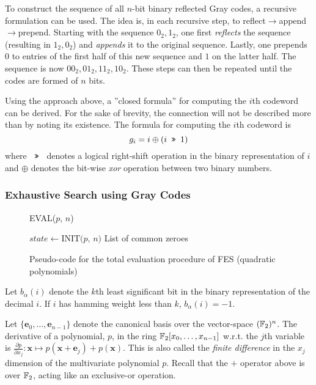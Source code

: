 To construct the sequence of all $n$-bit binary reflected Gray codes, a recursive formulation can be used. The idea is, in each recursive step, to reflect$\rightarrow$append$\rightarrow$prepend. Starting with the sequence $0_2, 1_2$, one first \textit{reflects} the sequence (resulting in $1_2, 0_2$) and \textit{appends} it to the original sequence. Lastly, one prepends $0$ to entries of the first half of this new sequence and $1$ on the latter half. The sequence is now $00_2, 01_2, 11_2, 10_2$. These steps can then be repeated until the codes are formed of $n$ bits.

Using the approach above, a ''closed formula'' for computing the $i$th codeword can be derived. For the sake of brevity, the connection will not be described more than by noting its existence. The formula for computing the $i$th codeword is
$$
    g_i = i \oplus (i \texttt{ >> } 1)
$$
where $\texttt{ >> }$ denotes a logical right-shift operation in the binary representation of $i$ and $\oplus$ denotes the bit-wise \textit{xor} operation between two binary numbers.

\subsubsection{Exhaustive Search using Gray Codes} \label{sec:prereq:fes:exh_g_code}
\begin{figure}[t]
    \begin{alg}
        \caption{EVAL($p$, $n$)}\label{alg:fes_eval}
        $state \gets \text{INIT($p$, $n$)}$\;
        \Return List of common zeroes
    \end{alg}
    \caption{Pseudo-code for the total evaluation procedure of FES (quadratic polynomials)}
\end{figure}

\begin{defn}[] \label{sec:prereq:def:bk}
    Let $b_\alpha(i)$ denote the $k$th least significant bit in the binary representation of the decimal $i$. If $i$ has hamming weight less than $k$, $b_\alpha(i) = -1$.
\end{defn}

\begin{defn}[Derivatives] \label{sec:prereq:deriv}
    Let $\{\mathbf{e}_0, \dots, \mathbf{e}_{n-1}\}$ denote the canonical basis over the vector-space $(\mathbb{F}_2)^n$. The derivative of a polynomial, $p$, in the ring $\mathbb{F}_2[x_0,\dots,x_{n-1}]$ w.r.t. the $j$th variable is $\frac{\partial p}{\partial x_j} : \mathbf{x} \mapsto p(\mathbf{x} + \mathbf{e}_j) + p(\mathbf{x})$. This is also called the \textit{finite difference} in the $x_j$ dimension of the multivariate polynomial $p$. Recall that the $+$ operator above is over $\mathbb{F}_2$, acting like an exclusive-or operation.
\end{defn} 

